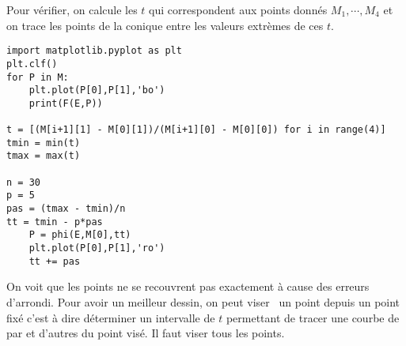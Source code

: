 Pour vérifier, on calcule les $t$ qui correspondent aux points donnés $M_1,\cdots, M_4$ et on trace les points de la conique entre les valeurs extrèmes de ces $t$.
\begin{verbatim}
import matplotlib.pyplot as plt
plt.clf()
for P in M:
    plt.plot(P[0],P[1],'bo')
    print(F(E,P))

t = [(M[i+1][1] - M[0][1])/(M[i+1][0] - M[0][0]) for i in range(4)]
tmin = min(t)
tmax = max(t)

n = 30
p = 5
pas = (tmax - tmin)/n
tt = tmin - p*pas
    P = phi(E,M[0],tt)
    plt.plot(P[0],P[1],'ro')
    tt += pas
\end{verbatim}
On voit que les points ne se recouvrent pas exactement à cause des erreurs d'arrondi.\newline
Pour avoir un meilleur dessin, on peut \og viser\fg~ un point depuis un point fixé c'est à dire déterminer un intervalle de $t$ permettant de tracer une courbe de par et d'autres du point visé. Il faut viser tous les points.


